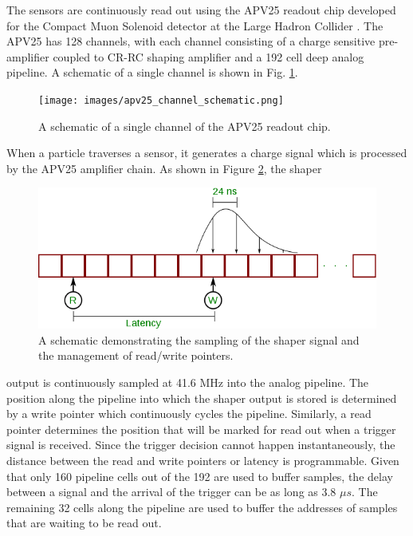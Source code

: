 The sensors are continuously read out using the APV25 readout chip developed for
the Compact Muon Solenoid detector at the Large Hadron Collider 
\cite{Raymond:2000ey}. The APV25 has 128 channels, with each channel consisting
of a charge sensitive pre-amplifier coupled to CR-RC shaping amplifier and a 192
cell deep analog pipeline.  A schematic of a single channel is shown in 
Fig. \ref{fig:apv25_schem}.
\begin{figure}
    \centering
    \texttt{[image: images/apv25\_channel\_schematic.png]}
    \caption{A schematic of a single channel of the APV25 readout chip.}
    \label{fig:apv25_schem}
\end{figure}

When a particle traverses a sensor, it generates a charge signal which is 
processed by the APV25 amplifier chain.  As shown in Figure 
\ref{fig:apv25_pipeline}, the shaper
\begin{figure}
    \centering
    \includegraphics[width=\textwidth]{images/apv25_pipeline.png}
    \caption{A schematic demonstrating the sampling of the shaper signal and
             the management of read/write pointers.}
    \label{fig:apv25_pipeline}
\end{figure}
output is continuously sampled at 41.6 MHz into the analog pipeline. The position
along the pipeline into which the shaper output is stored is determined by 
a write pointer which continuously cycles the pipeline.  Similarly, a read 
pointer determines the position that will be marked for read out when a trigger
signal is received.  Since the trigger decision cannot happen instantaneously,
the distance between the read and write pointers or latency is programmable.
Given that only 160 pipeline cells out of the 192 are used
to buffer samples, the delay between a signal and the arrival of the trigger can
be as long as 3.8 $\mu s$. The remaining 32 cells along the pipeline are used 
to buffer the addresses of samples that are waiting to be read out.

